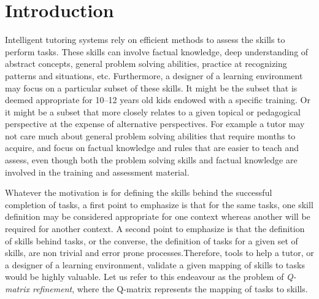 \documentclass[runningheads,a4paper]{llncs}
\begin{document}
\section{Introduction}\label{sec:intro}





Intelligent tutoring systems rely on efficient methods to assess the skills to perform tasks.  These skills can involve factual knowledge, deep understanding of abstract concepts, general problem solving abilities, practice at recognizing patterns and situations, etc.  Furthermore, a designer of a learning environment may focus on a particular subset of these skills. It might be the subset that is deemed appropriate for 10--12 years old kids endowed with a specific training. Or it might be a subset that more closely relates to a given topical or pedagogical perspective at the expense of alternative perspectives.  For example a tutor may not care much about general problem solving abilities that require months to acquire, and focus on factual knowledge and rules that are easier to teach and assess, even though both the problem solving skills and factual knowledge are involved in the training and assessment material.

Whatever the motivation is for defining the skills behind the successful completion of tasks, a first point to emphasize is that for the same tasks, one skill definition may be considered appropriate for one context whereas another will be required for another context.  A second point to emphasize is that the definition of skills behind tasks, or the converse, the definition of tasks for a given set of skills, are non trivial and error prone processes.Therefore, tools to help a tutor, or a designer of a learning environment, validate a given mapping of skills to tasks would be highly valuable.  Let us refer to this endeavour as the problem of \textit{Q-matrix refinement}, where the Q-matrix represents the mapping of tasks to skills.
\end{document}
